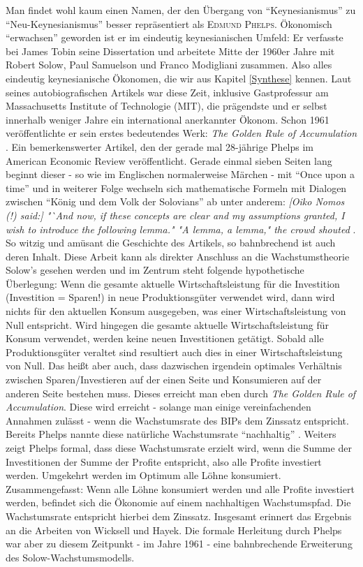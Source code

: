 Man findet wohl kaum einen Namen, der den Übergang von "`Keynesianismus"' zu "`Neu-Keynesianismus"' besser repräsentiert als \textsc{Edmund Phelps}. Ökonomisch "`erwachsen"' geworden ist er im eindeutig keynesianischen Umfeld: Er verfasste bei James Tobin seine Dissertation und arbeitete Mitte der 1960er Jahre mit Robert Solow, Paul Samuelson und Franco Modigliani zusammen. Also alles eindeutig keynesianische Ökonomen, die wir aus Kapitel \ref{Synthese} kennen. Laut seines autobiografischen Artikels \textcite[S. 93]{Heertje1995} war diese Zeit, inklusive Gastprofessur am Massachusetts Institute of Technologie (MIT), die prägendste und er selbst innerhalb weniger Jahre ein international anerkannter Ökonom. Schon 1961 veröffentlichte er sein erstes bedeutendes Werk: \textit{The Golden Rule of Accumulation} \parencite{Phelps1961}. Ein bemerkenswerter Artikel, den der gerade mal 28-jährige Phelps im American Economic Review veröffentlicht. Gerade einmal sieben Seiten lang beginnt dieser - so wie im Englischen normalerweise Märchen  - mit "`Once upon a time"' und in weiterer Folge wechseln sich mathematische Formeln mit Dialogen zwischen "`König und dem Volk der Solovians"' ab unter anderem: \textit{[Oiko Nomos (!) said:] "`And now, if these concepts are clear and my assumptions granted, I wish to introduce the following lemma." "A lemma, a lemma," the crowd shouted} \parencite[S. 640]{Phelps1961}. So witzig und amüsant die Geschichte des Artikels, so bahnbrechend ist auch deren Inhalt. Diese Arbeit kann als direkter Anschluss an die Wachstumstheorie Solow's gesehen werden und im Zentrum steht folgende hypothetische Überlegung: Wenn die gesamte aktuelle Wirtschaftsleistung für die Investition (Investition = Sparen!) in neue Produktionsgüter verwendet wird, dann wird nichts für den aktuellen Konsum ausgegeben, was einer Wirtschaftsleistung von Null entspricht. Wird hingegen die gesamte aktuelle Wirtschaftsleistung für Konsum verwendet, werden keine neuen Investitionen getätigt. Sobald alle Produktionsgüter veraltet sind resultiert auch dies in einer Wirtschaftsleistung von Null. Das heißt aber auch, dass dazwischen irgendein optimales Verhältnis zwischen Sparen/Investieren auf der einen Seite und Konsumieren auf der anderen Seite bestehen muss. Dieses erreicht man eben durch \textit{The Golden Rule of Accumulation}. Diese wird erreicht - solange man einige vereinfachenden Annahmen zulässt - wenn die Wachstumsrate des BIPs dem Zinssatz entspricht. Bereits Phelps nannte diese natürliche Wachstumsrate "`nachhaltig"' \parencite[S. 638]{Phelps1961}. Weiters zeigt Phelps formal, dass diese Wachstumsrate erzielt wird, wenn die Summe der Investitionen der Summe der Profite entspricht, also alle Profite investiert werden. Umgekehrt werden im Optimum alle Löhne konsumiert. Zusammengefasst: Wenn alle Löhne konsumiert werden und alle Profite investiert werden, befindet sich die Ökonomie auf einem nachhaltigen Wachstumspfad. Die Wachstumsrate entspricht hierbei dem Zinssatz. Insgesamt erinnert das Ergebnis an die Arbeiten von Wicksell und Hayek. Die formale Herleitung durch Phelps war aber zu diesem Zeitpunkt - im Jahre 1961 - eine bahnbrechende Erweiterung des Solow-Wachstumsmodells.

